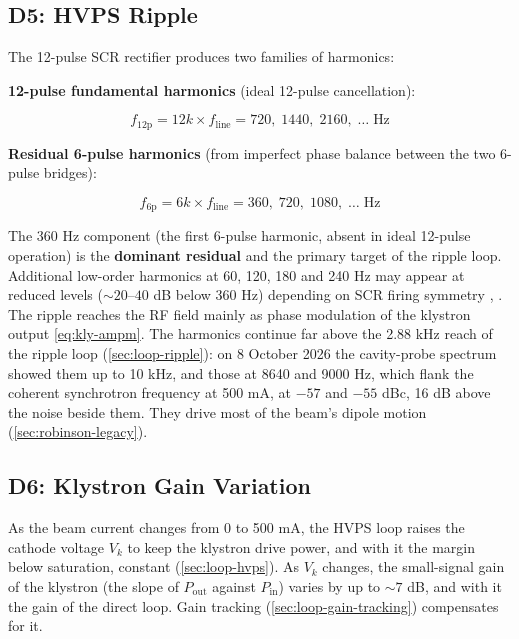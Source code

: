 \subsection{D5: HVPS Ripple}\label{sec:d5}


The 12-pulse SCR rectifier produces two families of harmonics:

\textbf{12-pulse fundamental harmonics} (ideal 12-pulse cancellation):

\begin{equation}\label{eq:ripple-12p}
f_\text{12p} = 12k \times f_\text{line} = 720,\;1440,\;2160,\;\ldots\;\text{Hz}
\end{equation}

\textbf{Residual 6-pulse harmonics} (from imperfect phase balance between the two 6-pulse bridges):

\begin{equation}\label{eq:ripple-6p}
f_\text{6p} = 6k \times f_\text{line} = 360,\;720,\;1080,\;\ldots\;\text{Hz}
\end{equation}

The 360 Hz component (the first 6-pulse harmonic, absent in ideal 12-pulse operation) is the \textbf{dominant residual} and the primary target of the ripple loop. Additional low-order harmonics at 60, 120, 180 and 240 Hz may appear at reduced levels (\(\sim 20\)--\(40\) dB below 360 Hz) depending on SCR firing symmetry , . The ripple reaches the RF field mainly as phase modulation of the klystron output \eqref{eq:kly-ampm}. The harmonics continue far above the 2.88 kHz reach of the ripple loop (\cref{sec:loop-ripple}): on 8 October 2026 the cavity-probe spectrum showed them up to 10 kHz, and those at 8640 and 9000 Hz, which flank the coherent synchrotron frequency at 500 mA, at \(-57\) and \(-55\) dBc, 16 dB above the noise beside them. They drive most of the beam's dipole motion (\cref{sec:robinson-legacy}).

\subsection{D6: Klystron Gain Variation}\label{sec:d6}


As the beam current changes from 0 to 500 mA, the HVPS loop raises the cathode voltage \(V_k\) to keep the klystron drive power, and with it the margin below saturation, constant (\cref{sec:loop-hvps}). As \(V_k\) changes, the small-signal gain of the klystron (the slope of \(P_\text{out}\) against \(P_\text{in}\)) varies by up to \(\sim 7\) dB, and with it the gain of the direct loop. Gain tracking (\cref{sec:loop-gain-tracking}) compensates for it.

